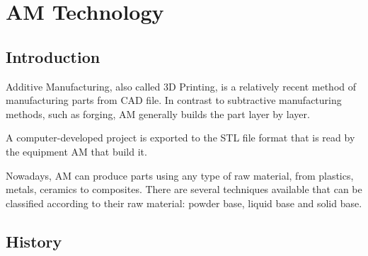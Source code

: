 \pagebreak

\section{AM Technology}

\subsection{Introduction}
Additive Manufacturing, also called 3D Printing, is a relatively recent method of manufacturing parts from \ac{CAD} file. In contrast to subtractive manufacturing methods, such as forging, AM generally builds the part layer by layer.\par
A computer-developed project is exported to the \ac{STL} file format that is read by the equipment AM that build it. \par
Nowadays, AM can produce parts using any type of raw material, from plastics, metals, ceramics to composites. There are several techniques available that can be classified according to their raw material: powder base, liquid base and solid base.\\

\subsection{History}

